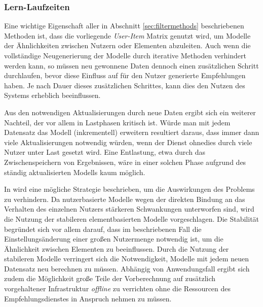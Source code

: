 
\subsubsection{Lern-Laufzeiten}

Eine wichtige Eigenschaft aller in Abschnitt \ref{sec:filtermethods} beschriebenen Methoden ist, dass die vorliegende \textit{User-Item} Matrix genutzt wird, um Modelle der Ähnlichkeiten zwischen Nutzern oder Elementen abzuleiten. Auch wenn die vollständige Neugenerierung der Modelle durch iterative Methoden verhindert werden kann, so müssen neu gewonnene Daten dennoch einen zusätzlichen Schritt durchlaufen, bevor diese Einfluss auf für den Nutzer generierte Empfehlungen haben. Je nach Dauer dieses zusätzlichen Schrittes, kann dies den Nutzen des Systems erheblich beeinflussen. %

Aus den notwendigen Aktualisierungen durch neue Daten ergibt sich ein weiterer Nachteil, der vor allem in Lastphasen kritisch ist. Würde man mit jedem Datensatz das Modell (inkrementell) erweitern resultiert daraus, dass immer dann viele Aktualisierungen notwendig würden, wenn der Dienst ohnedies durch viele Nutzer unter Last gesetzt wird. Eine Entlastung, etwa durch das Zwischenspeichern von Ergebnissen, wäre in einer solchen Phase aufgrund des ständig aktualisierten Modells kaum möglich.

In \citep{linden03} wird eine mögliche Strategie beschrieben, um die Auswirkungen des Problems zu verhindern. Da nutzerbasierte Modelle wegen der direkten Bindung an das Verhalten des einzelnen Nutzers stärkeren Schwankungen unterworfen sind, wird die Nutzung der stabileren elementbasierten Modelle vorgeschlagen. Die Stabilität begründet sich vor allem darauf, dass im beschriebenen Fall die Einstellungsänderung einer großen Nutzermenge notwendig ist, um die Ähnlichkeit zwischen Elementen zu beeinflussen. Durch die Nutzung der stabileren Modelle verringert sich die Notwendigkeit, Modelle mit jedem neuen Datensatz neu berechnen zu müssen. Abhängig von Anwendungsfall ergibt sich zudem die Möglichkeit große Teile der Vorberechnung auf zusätzlich vorgehaltener Infrastruktur \textit{offline} zu verrichten ohne die Ressourcen des Empfehlungsdienstes in Anspruch nehmen zu müssen.

